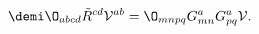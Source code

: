 \begin{equation}
\demi \O_{abcd}\tilde R^{cd} {\cal V}^{ab} =
\O_{mnpq}G^a_{mn}G^a_{pq} {\cal V}.
\label{ov}
\end{equation}

